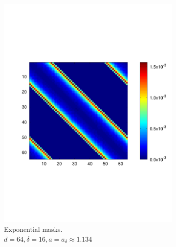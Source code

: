 \begin{figure}
  \centering
  \begin{subfigure}[b]{.49\textwidth}
    \centering
    \includegraphics[width=\textwidth,trim={.4in 2.5in .8in 2.5in}]{figs/expvar512}
    \caption{Exponential masks. \\ $d = 64, \delta = 16, a = a_\delta \approx 1.134$}
    \label{fig:expvar64}
  \end{subfigure}
  \begin{subfigure}[b]{.49\textwidth}
    \centering

\end{subfigure}
\end{figure}
